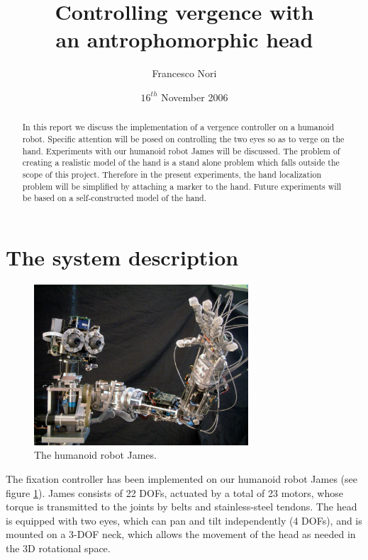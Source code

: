 \title {Controlling vergence with \\ an antrophomorphic head}
\author{Francesco Nori}
\date{$16^{th}$ November 2006}
\maketitle

\begin{abstract}
In this report we discuss the implementation of a vergence controller on a humanoid robot. Specific attention will be posed on controlling the two eyes so as to verge on the hand. Experiments with our humanoid robot James will be discussed. The problem of creating a realistic model of the hand is a stand alone problem which falls outside the scope of this project. Therefore in the present experiments, the hand localization problem will be simplified by attaching a marker to the hand. Future experiments will be based on a self-constructed model of the hand.
\end{abstract}

\section{The system description}

\begin{figure}[h!tbp]
\centering
\includegraphics[width=80mm]{Figure/James1.png}
\caption{The humanoid robot James.}
\label{Fig:PicureJames}
\end{figure}

The fixation controller has been implemented on our humanoid robot James (see figure \ref{Fig:PicureJames}). James consists of 22 DOFs, actuated by a total of 23 motors, whose torque is transmitted to the joints by belts and stainless-steel tendons. The head is equipped with two eyes, which can pan and tilt independently (4 DOFs), and is mounted on a 3-DOF neck, which allows the movement of the head as needed in the 3D rotational space.


